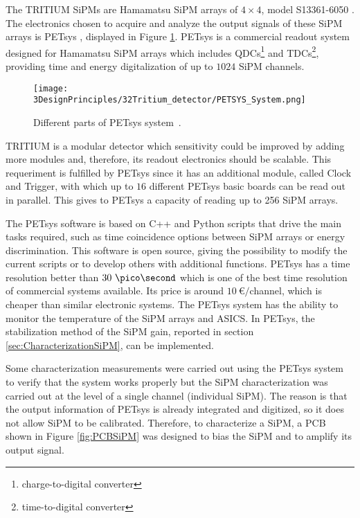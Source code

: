 The TRITIUM SiPMs are Hamamatsu SiPM arrays of $4\times 4$, model S13361-6050 \cite{DataSheetHammamatsu_16_SiPM_50}. The electronics chosen to acquire and analyze the output signals of these SiPM arrays is PETsys \cite{PETSYS}, displayed in Figure \ref{fig:PETSYS}. PETsys is a commercial readout system designed for Hamamatsu SiPM arrays which includes QDCs\footnote{charge-to-digital converter} and TDCs\footnote{time-to-digital converter}, providing time and energy digitalization of up to $1024$ SiPM channels. 

\begin{figure}[h]
\centering
\texttt{[image: 3DesignPrinciples/32Tritium\_detector/PETSYS\_System.png]}
\caption{Different parts of PETsys system\label{fig:PETSYS}~\cite{PETSYS}.}
\end{figure}
TRITIUM is a modular detector which sensitivity could be improved by adding more modules and, therefore, its readout electronics should be scalable. This requeriment is fulfilled by PETsys since it has an additional module, called Clock and Trigger, with which up to $16$ different PETsys basic boards can be read out in parallel. This gives to PETsys a capacity of reading up to 256 SiPM arrays. 

The PETsys software is based on C++ and Python scripts that drive the main tasks required, such as time coincidence options between SiPM arrays or energy discrimination. This software is open source, giving the possibility to modify the current scripts or to develop others with additional functions. PETsys has a time resolution better than $30~\pico\second$ which is one of the best time resolution of commercial systems available. Its price is around $10~\euro/$channel, which is cheaper than similar electronic systems. The PETsys system has the ability to monitor the temperature of the SiPM arrays and ASICS. In PETsys, the stabilization method of the SiPM gain, reported in section \ref{sec:CharacterizationSiPM}, can be implemented.

Some characterization measurements were carried out using the PETsys system to verify that the system works properly but the SiPM characterization was carried out at the level of a single channel (individual SiPM). The reason is that the output information of PETsys is already integrated and digitized, so it does not allow SiPM to be calibrated. Therefore, to characterize a SiPM, a PCB shown in Figure \ref{fig:PCBSiPM} was designed to bias the SiPM and to amplify its output signal. 

